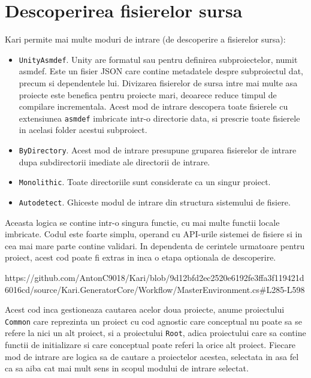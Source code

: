 \documentclass{report}
\begin{document}
\section{Descoperirea fisierelor sursa}

Kari permite mai multe moduri de intrare (de descoperire a fisierelor
sursa):

\begin{itemize}
\item
  \texttt{UnityAsmdef}. Unity are formatul sau pentru definirea
  subproiectelor, numit asmdef. Este un fisier JSON care contine
  metadatele despre subproiectul dat, precum si dependentele lui.
  Divizarea fisierelor de sursa intre mai multe asa proiecte este
  benefica pentru proiecte mari, deoarece reduce timpul de compilare
  incrementala. Acest mod de intrare descopera toate fisierele cu
  extensiunea \texttt{asmdef} imbricate intr-o directorie data, si
  prescrie toate fisierele in acelasi folder acestui subproiect.
\item
  \texttt{ByDirectory}. Acest mod de intrare presupune gruparea
  fisierelor de intrare dupa subdirectorii imediate ale directorii de
  intrare.
\item
  \texttt{Monolithic}. Toate directoriile sunt considerate ca un singur
  proiect.
\item
  \texttt{Autodetect}. Ghiceste modul de intrare din structura
  sistemului de fisiere.
\end{itemize}

Aceasta logica se contine intr-o singura functie, cu mai multe functii
locale imbricate. Codul este foarte simplu, operand cu API-urile
sistemei de fisiere si in cea mai mare parte contine validari. In
dependenta de cerintele urmatoare pentru proiect, acest cod poate fi
extras in inca o etapa optionala de descoperire.

https://github.com/AntonC9018/Kari/blob/9d12bfd2ec2520e6192fe3ffa3f119421d6016cd/source/Kari.GeneratorCore/Workflow/MasterEnvironment.cs\#L285-L598

Acest cod inca gestioneaza cautarea acelor doua proiecte, anume
proiectului \texttt{Common} care reprezinta un proiect cu cod agnostic
care conceptual nu poate sa se refere la nici un alt proiect, si a
proiectului \texttt{Root}, adica proiectului care sa contine functii de
initializare si care conceptual poate referi la orice alt proiect.
Fiecare mod de intrare are logica sa de cautare a proiectelor acestea,
selectata in asa fel ca sa aiba cat mai mult sens in scopul modului de
intrare selectat.
\end{document}
